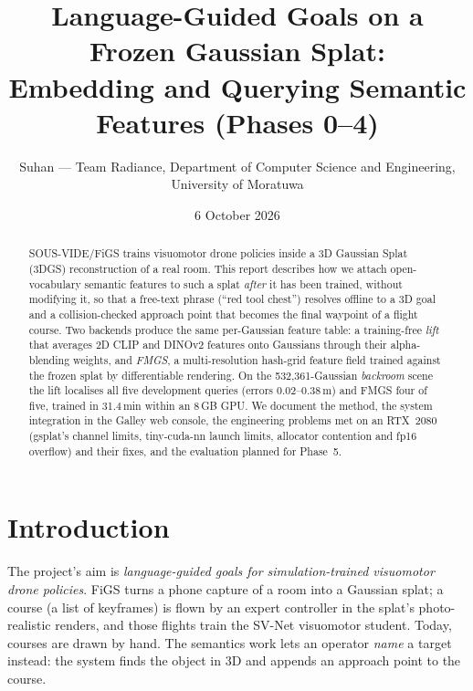 \documentclass[11pt,a4paper]{article}
\title{Language-Guided Goals on a Frozen Gaussian Splat:\\
Embedding and Querying Semantic Features (Phases 0--4)}
\author{Suhan --- Team Radiance, Department of Computer Science and Engineering,\\University of Moratuwa}
\date{6 October 2026}
\begin{document}
\maketitle

\begin{abstract}
SOUS-VIDE/FiGS trains visuomotor drone policies inside a 3D Gaussian Splat (3DGS) reconstruction of a real room.
This report describes how we attach open-vocabulary semantic features to such a splat \emph{after} it has been
trained, without modifying it, so that a free-text phrase (``red tool chest'') resolves offline to a 3D goal and
a collision-checked approach point that becomes the final waypoint of a flight course. Two backends produce the
same per-Gaussian feature table: a training-free \emph{lift} that averages 2D CLIP and DINOv2 features onto
Gaussians through their alpha-blending weights, and \emph{FMGS}, a multi-resolution hash-grid feature field
trained against the frozen splat by differentiable rendering. On the 532{,}361-Gaussian \emph{backroom} scene the
lift localises all five development queries (errors 0.02--0.38\,m) and FMGS four of five, trained in 31.4\,min
within an 8\,GB GPU. We document the method, the system integration in the Galley web console, the engineering
problems met on an RTX~2080 (gsplat's channel limits, tiny-cuda-nn launch limits, allocator contention and fp16
overflow) and their fixes, and the evaluation planned for Phase~5.
\end{abstract}

\tableofcontents
\newpage

\section{Introduction}

The project's aim is \emph{language-guided goals for simulation-trained visuomotor drone policies}. FiGS turns a
phone capture of a room into a Gaussian splat; a course (a list of keyframes) is flown by an expert controller in
the splat's photo-realistic renders, and those flights train the SV-Net visuomotor student. Today, courses are
drawn by hand. The semantics work lets an operator \emph{name} a target instead: the system finds the object in
3D and appends an approach point to the course.
\end{document}
